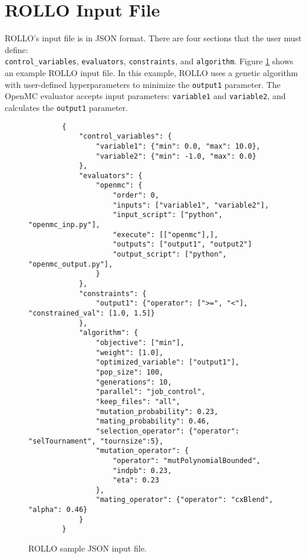 \section{ROLLO Input File}
\gls{ROLLO}'s input file is in JSON format. 
There are four sections that the user must define: \\ \texttt{control\_variables}, 
\texttt{evaluators}, \texttt{constraints}, and \texttt{algorithm}. 
Figure \ref{fig:rollo-input} shows an example \gls{ROLLO} input file. 
In this example, \gls{ROLLO} uses a genetic algorithm with user-defined 
hyperparameters to minimize the \texttt{output1} parameter.
The OpenMC evaluator accepts input parameters: \texttt{variable1} and 
\texttt{variable2}, and calculates the \texttt{output1} parameter.
\begin{figure}[htbp]
    \begin{verbatim}
        {
            "control_variables": {
                "variable1": {"min": 0.0, "max": 10.0}, 
                "variable2": {"min": -1.0, "max": 0.0}
            }, 
            "evaluators": {
                "openmc": {
                    "order": 0,
                    "inputs": ["variable1", "variable2"],
                    "input_script": ["python", "openmc_inp.py"],
                    "execute": [["openmc"],],
                    "outputs": ["output1", "output2"]
                    "output_script": ["python", "openmc_output.py"], 
                }
            }, 
            "constraints": {
                "output1": {"operator": [">=", "<"], "constrained_val": [1.0, 1.5]}
            }, 
            "algorithm": {
                "objective": ["min"], 
                "weight": [1.0],
                "optimized_variable": ["output1"], 
                "pop_size": 100, 
                "generations": 10, 
                "parallel": "job_control",
                "keep_files": "all",
                "mutation_probability": 0.23,
                "mating_probability": 0.46,
                "selection_operator": {"operator": "selTournament", "tournsize":5},
                "mutation_operator": {
                    "operator": "mutPolynomialBounded",
                    "indpb": 0.23,
                    "eta": 0.23
                },
                "mating_operator": {"operator": "cxBlend", "alpha": 0.46}
            }
        }
    \end{verbatim}
    \caption{\acrfull{ROLLO} sample JSON input file.}
    \label{fig:rollo-input}
\end{figure}

